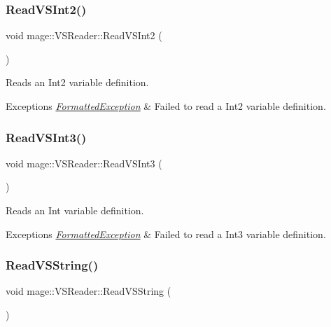 \subsubsection{\texorpdfstring{Read\+V\+S\+Int2()}{ReadVSInt2()}}
{\footnotesize\ttfamily void mage\+::\+V\+S\+Reader\+::\+Read\+V\+S\+Int2 (\begin{DoxyParamCaption}{ }\end{DoxyParamCaption})\hspace{0.3cm}{\ttfamily [private]}}

Reads an Int2 variable definition.


\begin{DoxyExceptions}{Exceptions}
{\em \hyperlink{classmage_1_1_formatted_exception}{Formatted\+Exception}} & Failed to read a Int2 variable definition. \\
\hline
\end{DoxyExceptions}
\hypertarget{classmage_1_1_v_s_reader_a6fa8fa2cbb66a9a1872bb84a0612a32d}{}\label{classmage_1_1_v_s_reader_a6fa8fa2cbb66a9a1872bb84a0612a32d} 
\subsubsection{\texorpdfstring{Read\+V\+S\+Int3()}{ReadVSInt3()}}
{\footnotesize\ttfamily void mage\+::\+V\+S\+Reader\+::\+Read\+V\+S\+Int3 (\begin{DoxyParamCaption}{ }\end{DoxyParamCaption})\hspace{0.3cm}{\ttfamily [private]}}

Reads an Int variable definition.


\begin{DoxyExceptions}{Exceptions}
{\em \hyperlink{classmage_1_1_formatted_exception}{Formatted\+Exception}} & Failed to read a Int3 variable definition. \\
\hline
\end{DoxyExceptions}
\hypertarget{classmage_1_1_v_s_reader_a8d00057f90b2a2ed2e84e47530f91227}{}\label{classmage_1_1_v_s_reader_a8d00057f90b2a2ed2e84e47530f91227} 
\subsubsection{\texorpdfstring{Read\+V\+S\+String()}{ReadVSString()}}
{\footnotesize\ttfamily void mage\+::\+V\+S\+Reader\+::\+Read\+V\+S\+String (\begin{DoxyParamCaption}{ }\end{DoxyParamCaption})\hspace{0.3cm}{\ttfamily [private]}}

